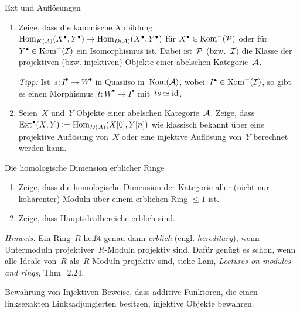 \documentclass{uebblatt}
\begin{document}

\begin{aufgabe}{Ext und Auflösungen}
\begin{enumerate}
\item Zeige, dass die kanonische Abbildung~$\Hom_{K(\A)}(X^\bullet,Y^\bullet)
\to \Hom_{D(\A)}(X^\bullet,Y^\bullet)$ für $X^\bullet \in \Kom^{-}(\P)$ oder
für~$Y^\bullet \in \Kom^{+}(\I)$ ein Isomorphismus ist. Dabei ist~$\P$
(bzw.~$\I$) die Klasse der projektiven (bzw. injektiven) Objekte einer
abelschen Kategorie~$\A$.

{\tiny \emph{Tipp:} Ist~$s : I^\bullet \to W^\bullet$ in Quasiiso in~$\Kom(\A)$,
wobei~$I^\bullet \in \Kom^{+}(\I)$, so gibt es einen
Morphismus~$t : W^\bullet \to I^\bullet$ mit~$ts \simeq \id$.\par}
\item Seien~$X$ und~$Y$ Objekte einer abelschen Kategorie~$\A$. Zeige,
dass~$\Ext^\bullet(X,Y) \defeq \Hom_{D(\A)}(X[0],Y[n])$ wie klassisch bekannt
über eine projektive Auflösung von~$X$ oder eine injektive Auflösung von~$Y$
berechnet werden kann.
\end{enumerate}
\end{aufgabe}

\begin{aufgabe}{Die homologische Dimension erblicher Ringe}
\begin{enumerate}
\item Zeige, dass die homologische Dimension der Kategorie aller (nicht nur
kohärenter) Moduln über einem erblichen Ring $\leq 1$ ist.
\item Zeige, dass Hauptidealbereiche erblich sind.
\end{enumerate}
{\tiny\emph{Hinweis:} Ein Ring~$R$ heißt genau dann \emph{erblich} (engl.
\emph{hereditary}), wenn Untermoduln projektiver~$R$-Moduln projektiv sind.
Dafür genügt es schon, wenn alle Ideale von~$R$ als~$R$-Moduln projektiv
sind, siehe Lam, \emph{Lectures on modules and rings}, Thm.~2.24.\par}
\end{aufgabe}

\begin{aufgabe}{Bewahrung von Injektiven}
Beweise, dass additive Funktoren, die einen linksexakten Linksadjungierten
besitzen, injektive Objekte bewahren.
\end{aufgabe}
\end{document}
